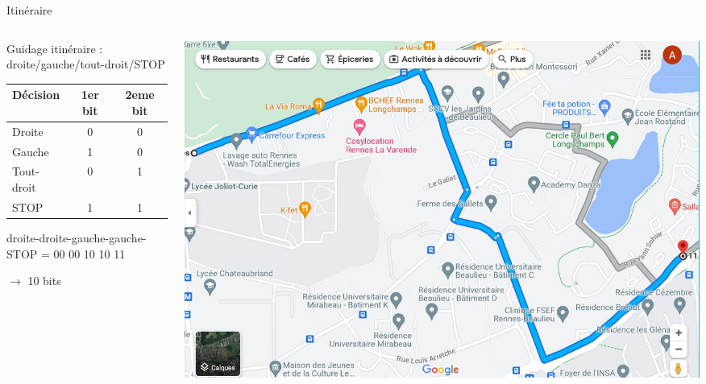 \documentclass[9pt, aspectratio=169]{beamer}
\begin{document}
\begin{frame}{Itinéraire} %
\begin{columns}
   \begin{column}{0.6\textwidth}
		Guidage itinéraire : droite/gauche/tout-droit/STOP

        \begin{table}[]
            \begin{tabular}{l|c|c}
            \textbf{Décision}    & \textbf{1er bit} & \textbf{2eme bit} \\
            \hline
             Droite     & 0 & 0  \\
             Gauche     & 1 & 0 \\
             Tout-droit & 0 & 1 \\
             STOP       & 1 & 1\\
        \end{tabular}
        \end{table}

        droite-droite-gauche-gauche-STOP = 00 00 10 10 11
        
        $\rightarrow$ 10 bits
        
   \end{column}
   \begin{column}{0.39\textwidth}
		\includegraphics[width=\textwidth]{fig/maps_iut_gayeulles.jpg}
   \end{column}
\end{columns}
\end{frame}
\end{document}

